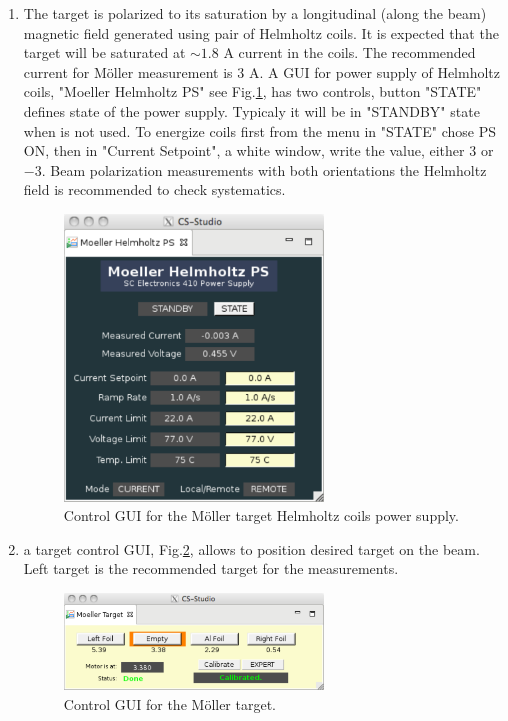 \begin{enumerate}
\begin{enumerate}
\item The target is polarized to its saturation by a longitudinal (along the beam) magnetic field generated using pair of Helmholtz coils. It is expected that the target will be saturated at $\sim 1.8$ A current in the coils. The recommended current for M{\"o}ller measurement is $3$ A. A GUI for power supply of Helmholtz coils, "Moeller Helmholtz PS" see Fig.\ref{moller_helm}, has two controls, button "STATE" defines state of the power supply. Typicaly it will be in "STANDBY" state when is not used. To energize coils first from the menu in "STATE" chose PS ON, then in "Current Setpoint", a white window, write the value, either $3$ or $-3$. Beam polarization measurements with both orientations the Helmholtz field is recommended to check systematics.    

\begin{figure}
\begin{center}
\includegraphics[width=0.65\textwidth]{moller_helmholtz.pdf}
\caption{Control GUI for the M{\"o}ller target Helmholtz coils power supply.}
\label{moller_helm}
\end{center}
\end{figure}

\item a target control GUI, Fig.\ref{moller_target}, allows to position desired target on the beam. Left target is the recommended target for the measurements.

\begin{figure}
\begin{center}
\includegraphics[width=0.65\textwidth]{moller_target.pdf}
\caption{Control GUI for the M{\"o}ller target.}
\label{moller_target}
\end{center}
\end{figure}


\end{enumerate}
\end{enumerate}
